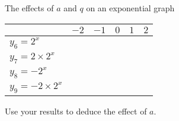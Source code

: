 \begin{Investigation}{The effects of $a$ and $q$ on an exponential graph}
\begin{table}[H]
\begin{center}
\begin{tabular}{|l|c|c|c|c|c|}
\hline
   &  $-2$ & $-1$ & $0$ & $1$ & $2$ 
\\ \hline
$y_6=2^{x}$& \hspace{1cm} & \hspace{1cm} & \hspace{1cm} & \hspace{1cm} & \hspace{1cm}
\\ \hline
$y_7=2 \times 2^{x}$&  &&&&
\\ \hline
$y_8=-2^{x}$&  &&&&
\\ \hline
$y_9=-2 \times 2^{x}$&  &&&&
\\ \hline

\end{tabular}
\end{center}
\end{table}
Use your results to deduce the effect of $a$.
\end{Investigation}


